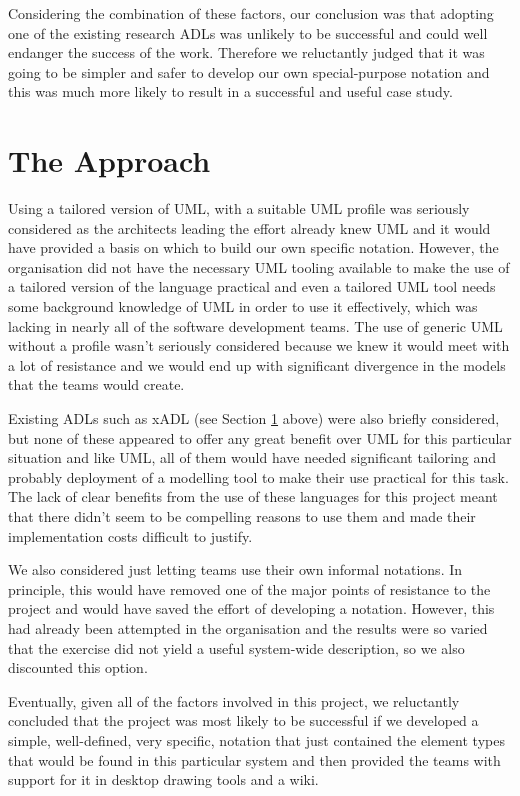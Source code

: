 Considering the combination of these factors, our conclusion was that adopting one of the existing research ADLs was unlikely to be successful and could well endanger the success of the work.  Therefore we reluctantly judged that it was going to be simpler and safer to develop our own special-purpose notation and this was much more likely to result in a successful and useful case study.  
  
\section{The Approach}
\label{sec:approach}

  Using a tailored version of UML, with a suitable UML profile was seriously considered as the architects leading the effort already knew UML and it would have provided a basis on which to build our own specific notation.  However, the organisation did not have the necessary UML tooling available to make the use of a tailored version of the language practical and even a tailored UML tool needs some background knowledge of UML in order to use it effectively, which was lacking in nearly all of the software development teams.  The use of generic UML without a profile wasn't seriously considered because we knew it would meet with a lot of resistance and we would end up with significant divergence in the models that the teams would create.

  Existing ADLs such as xADL (see Section \ref{sec:approach} above) were also briefly considered, but none of these appeared to offer any great benefit over UML for this particular situation and like UML, all of them would have needed significant tailoring and probably deployment of a modelling tool to make their use practical for this task.  The lack of clear benefits from the use of these languages for this project meant that there didn't seem to be compelling reasons to use them and made their implementation costs difficult to justify.

  We also considered just letting teams use their own informal notations.  In principle, this would have removed one of the major points of resistance to the project and would have saved the effort of developing a notation.  However, this had already been attempted in the organisation and the results were so varied that the exercise did not yield a useful system-wide description, so we also discounted this option.

  Eventually, given all of the factors involved in this project, we reluctantly concluded that the project was most likely to be successful if we developed a simple, well-defined, very specific, notation that just contained the element types that would be found in this particular system and then provided the teams with support for it in desktop drawing tools and a wiki.


